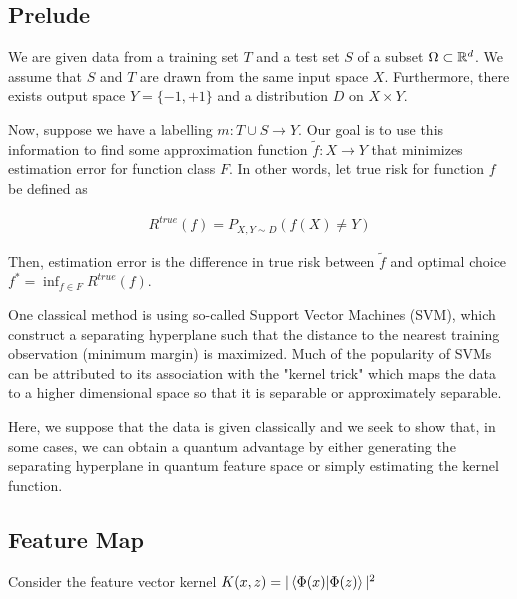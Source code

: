 \documentclass[main.tex]{subfiles}
\begin{document}
\subsection{Prelude}

We are given data from a training set $T$ and a test set $S$ of a subset $\Omega \subset \mathbb{R}^d$. We assume that $S$ and $T$ are drawn from the same input space $X$. Furthermore, there exists output space $Y = \{ -1, +1 \} $ and a distribution $D$ on $X \times Y$.

Now, suppose we have a labelling $m: T \cup S \rightarrow Y$.  Our goal is to use this information to find some approximation function $\tilde{f} : X \rightarrow Y$ that minimizes estimation error for function class $F$. In other words, let true risk for function $f$ be defined as

\begin{align*}
R^{true}(f) = P_{X, Y \sim D}(f(X) \neq Y)	
\end{align*}

Then, estimation error is the difference in true risk between $\tilde{f}$ and optimal choice $f^* = \inf_{f \in F}R^{true}(f)$.

One classical method is using so-called Support Vector Machines (SVM), which construct a separating hyperplane such that the distance to the nearest training observation (minimum margin) is maximized. Much of the popularity of SVMs can be attributed to its association with the "kernel trick" which maps the data to a higher dimensional space so that it is separable or approximately separable.

Here, we suppose that the data is given classically and we seek to show that, in some cases, we can obtain a quantum advantage by either generating the separating hyperplane in quantum feature space or simply estimating the kernel function.

\subsection{Feature Map}

Consider the feature vector kernel $K(x, z) = | \bra{\Phi(x)}\ket{\Phi(z)} |^2$
\end{document}
